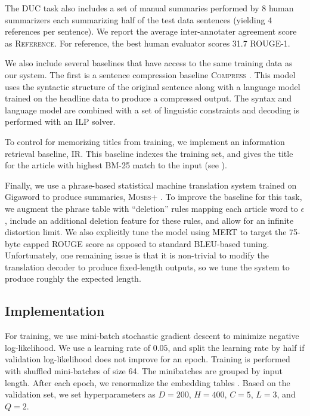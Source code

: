 \documentclass[11pt,a4paper]{article}
\begin{document}
The DUC task also includes a set of manual summaries performed by 8
human summarizers each summarizing half of the test data sentences (yielding 4 references per sentence). We report the
average inter-annotater agreement score as \textsc{Reference}. For reference, the best human evaluator scores 31.7 ROUGE-1.

We also include several baselines that have access to the same
training data as our system. The first is a sentence compression
baseline \textsc{Compress} \cite{clarke2008global}. This model uses
the syntactic structure of the original sentence along with a language
model trained on the headline data to produce a compressed output.  The syntax and language model
are combined with a set of linguistic constraints and decoding is performed with an ILP solver. 



To control for memorizing titles from training, we implement an
information retrieval baseline, \textsc{IR}. This baseline indexes the
training set, and gives the title for the article with highest
BM-25 match to the input (see ).

Finally, we use a   phrase-based statistical machine translation system trained on Gigaword
to produce summaries, \textsc{Moses+} \cite{koehn2007moses}. To improve the baseline for this task, we augment the phrase table
with ``deletion'' rules mapping each article word to $\epsilon$,
include an additional deletion feature for these rules, and allow for an
infinite distortion limit. We also explicitly tune the model using
MERT to target the 75-byte capped ROUGE score as opposed to standard
BLEU-based tuning. Unfortunately, one remaining issue is that it is non-trivial to modify the translation decoder to produce fixed-length outputs, so we tune the system to produce roughly the expected length.


\subsection{Implementation}

For training, we use mini-batch stochastic gradient descent to
minimize negative log-likelihood. We use a learning rate of $0.05$,
and split the learning rate by half if validation log-likelihood does
not improve for an epoch. Training is performed with shuffled
mini-batches of size 64. The minibatches are grouped by input
length. After each epoch, we renormalize the embedding tables \cite{hinton2012improving}. Based on the
validation set, we set hyperparameters as $D=200$, $H=400$, $C=5$,
$L=3$, and $Q = 2$.
\end{document}
